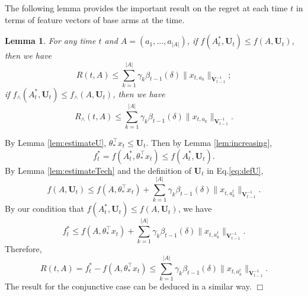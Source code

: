 \documentclass{article}
\newcommand{\bU}{\mathbf{U}}
\newcommand{\bV}{\mathbf{V}}
\newcommand{\abs}[1]{\left| #1 \right|}
\newcommand{\norm}[1]{\| #1 \|}
\newtheorem{lemma}[theorem]{Lemma}%
\newenvironment{proof}{\noindent {\textbf{Proof. }}}{$\Box$ \medskip}
\begin{document}
The following lemma provides the important result on the regret at each time $t$
	in terms of feature vectors of base arms at the time.
\begin{lemma}
	\label{lem:DeltaEstimate}
	For any time $t$ and $A = (a_1, \ldots, a_{\abs{A}})$, if $f(A_t^*, \bU_t) \leq f(A, \bU_t)$, then we have
	$$
	R(t,A) \leq \sum_{k=1}^{\abs{A}} \gamma_k \beta_{t-1}(\delta)\norm{x_{t,a_k}}_{\bV_{t-1}^{-1}};
	$$
	if $f_{\wedge}(A_t^*, \bU_t) \leq f_{\wedge}(A, \bU_t)$, then we have
	$$
	R_{\wedge}(t, A) \leq \sum_{k=1}^{\abs{A}} \gamma_k \beta_{t-1}(\delta)\norm{x_{t,a_k}}_{\bV_{t-1}^{-1}}.
	$$
\end{lemma}
\begin{proof}
By Lemma \ref{lem:estimateU}, $\theta_{\ast}^{\top}x_t \leq \bU_t$. Then by Lemma \ref{lem:increasing},
$$
f_t^{\ast} = f(A_t^{\ast}, \theta_{\ast}^{\top}x_t) \leq f(A_t^{\ast}, \bU_t).
$$
By Lemma \ref{lem:estimateTech} and the definition of $\bU_t$ in Eq.\eqref{eq:defU},
$$
f(A, \bU_t) \leq f(A, \theta_{\ast}^{\top}x_t) + \sum_{k=1}^{\abs{A}} \gamma_k \beta_{t-1}(\delta)\norm{x_{t, a_k^t}}_{\bV_{t-1}^{-1}}.
$$
By our condition that $f(A_t^{\ast}, \bU_t) \leq f(A, \bU_t)$, we have 
$$
f_t^{\ast} \leq f(A, \theta_{\ast}^{\top}x_t) + \sum_{k=1}^{\abs{A}} \gamma_k \beta_{t-1}(\delta)\norm{x_{t, a_k^t}}_{\bV_{t-1}^{-1}}.
$$
Therefore,
$$
R(t, A) = f_t^{\ast} - f(A, \theta_{\ast}^{\top}x_t) \leq \sum_{k=1}^{\abs{A}} \gamma_k \beta_{t-1}(\delta)\norm{x_{t, a_k^t}}_{\bV_{t-1}^{-1}}.
$$
The result for the conjunctive case can be deduced in a similar way.
\end{proof}
\end{document}
